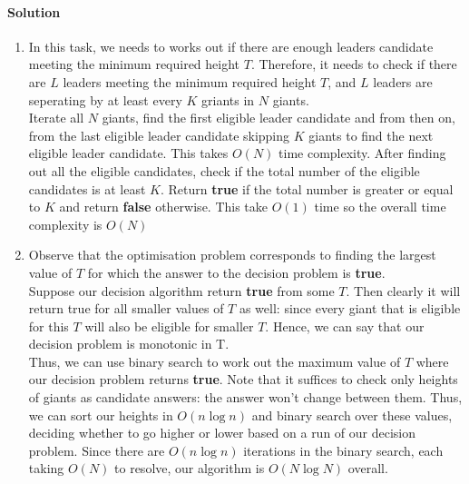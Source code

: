 \documentclass[a4paper]{scrartcl}
\begin{document}
\paragraph{Solution}
\begin{enumerate}[label=(\alph*)]
  \item In this task, we needs to works out if there are enough leaders candidate meeting the minimum required height $T$. Therefore, it needs to check if there are $L$ leaders meeting the minimum required height $T$, and $L$ leaders are seperating by at least every $K$ griants in $N$ giants.\\
  Iterate all $N$ giants, find the first eligible leader candidate and from then on, from the last eligible leader candidate skipping $K$ giants to find the next eligible leader candidate. This takes $O(N)$ time complexity.
  After finding out all the eligible candidates, check if the total number of the eligible candidates is at least $K$. Return \textbf{true} if the total number is greater or equal to $K$ and return \textbf{false} otherwise. This take $O(1)$ time so the overall time complexity is $O(N)$
  \item  
  
  
  
  Observe that the optimisation problem corresponds to finding the largest value of $T$ for which the answer to the decision problem is {\bfseries true}.\\
  Suppose our decision algorithm return \textbf{true} from some $T$. Then clearly it will return true for all smaller values of $T$ as well: since every giant that is eligible for this $T$ will also be eligible for smaller $T$. Hence, we can say that our decision problem is monotonic in T.\\
  Thus, we can use binary search to work out the maximum value of $T$ where our decision problem returns \textbf{true}. Note that it suffices to check only heights of giants as candidate answers: the answer won't change between them. Thus, we can sort our heights in $O(n\log{n})$ and binary search over these values, deciding whether to go higher or lower based on a run of our decision problem. Since there are $O(n\log{n})$ iterations in the binary search, each taking $O(N)$ to resolve, our algorithm is $O(N\log{N})$ overall.
\end{enumerate}
\end{document}
